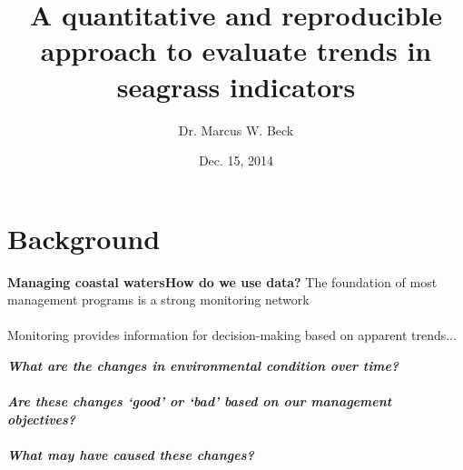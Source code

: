 \documentclass[serif]{beamer}\usepackage[]{graphicx}\usepackage[]{color}
\newcommand{\emtxt}[1]{\textbf{\textit{#1}}}
\begin{document}
\title[Evaluating water quality]{\textbf{A quantitative and reproducible approach to evaluate trends in seagrass indicators}}
\author[M. Beck]{Dr. Marcus W. Beck}


\date{Dec. 15, 2014}


\begin{frame}[shrink]
\titlepage
\end{frame}

\section{Background}

\begin{frame}{\textbf{Managing coastal waters}}{\textbf{How do we use data?}}
The foundation of most management programs is a strong monitoring network \scriptsize \cite{NRC90}\\~\\
\normalsize
Monitoring provides information for decision-making based on apparent trends...
\vspace{0.2in}
\begin{center}
\emtxt{What are the changes in environmental condition over time?}\\~\\
\emtxt{Are these changes `good' or `bad' based on our management objectives?}\\~\\
\emtxt{What may have caused these changes?}
\end{center}
\end{frame}
\end{document}

